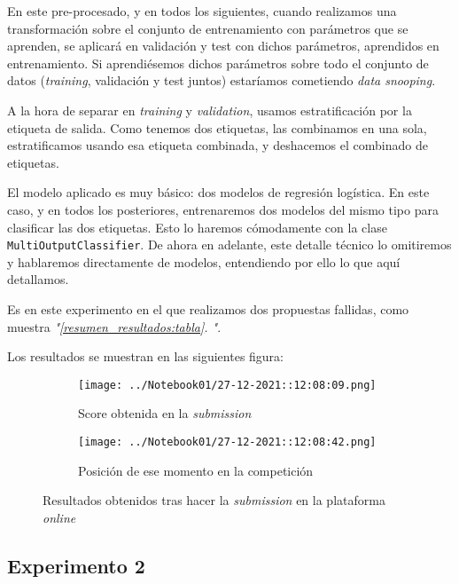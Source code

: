 \documentclass[11pt]{article}
\newcommand{\customcite}[1]{\emph{"\ref{#1}. \nameref{#1}"}}
\begin{document}
En este pre-procesado, y en todos los siguientes, cuando realizamos una transformación sobre el conjunto de entrenamiento con parámetros que se aprenden, se aplicará en validación y test con dichos parámetros, aprendidos en entrenamiento. Si aprendiésemos dichos parámetros sobre todo el conjunto de datos (\emph{training}, validación y test juntos) estaríamos cometiendo \emph{data snooping}.

A la hora de separar en \emph{training} y \emph{validation}, usamos estratificación por la etiqueta de salida. Como tenemos dos etiquetas, las combinamos en una sola, estratificamos usando esa etiqueta combinada, y deshacemos el combinado de etiquetas.

El modelo aplicado es muy básico: dos modelos de regresión logística. En este caso, y en todos los posteriores, entrenaremos dos modelos del mismo tipo para clasificar las dos etiquetas. Esto lo haremos cómodamente con la clase \lstinline{MultiOutputClassifier}. De ahora en adelante, este detalle técnico lo omitiremos y hablaremos directamente de modelos, entendiendo por ello lo que aquí detallamos.

Es en este experimento en el que realizamos dos propuestas fallidas, como muestra \customcite{resumen_resultados:tabla}.

Los resultados se muestran en las siguientes figura:

\begin{figure}[H]
    \centering

    \begin{subfigure}[b]{0.45 \textwidth}
        \texttt{[image: ../Notebook01/27-12-2021::12:08:09.png]}
        \caption{Score obtenida en la \emph{submission}}
    \end{subfigure}
    \begin{subfigure}[b]{0.45 \textwidth}
        \texttt{[image: ../Notebook01/27-12-2021::12:08:42.png]}
        \caption{Posición de ese momento en la competición}
    \end{subfigure}

    \caption{Resultados obtenidos tras hacer la \emph{submission} en la plataforma \emph{online}}
\end{figure}

\pagebreak

\subsection{Experimento 2}
\end{document}
